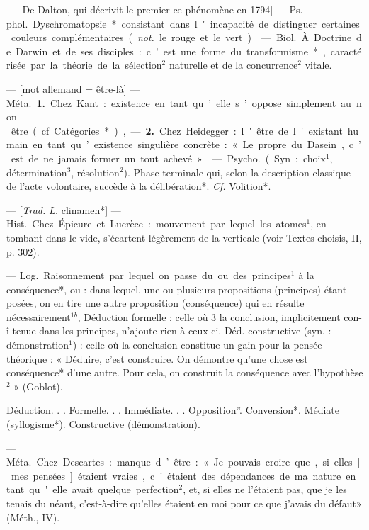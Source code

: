 
	\begin{itemize}[leftmargin=1cm, label=, itemsep=1pt]

 — [De Dalton, qui décrivit
le premier ce phénomène en 1794]
— \si{Ps. phol.} Dyschromatopsie* consistant dans l'incapacité de distinguer certaines couleurs complémentaires ({\it not.} le rouge et le vert).

 — \si{Biol.} À Doctrine de
Darwin et de ses disciples : c'est
une forme du transformisme*, caractérisée par la théorie de la sélection$^2$
naturelle et de la concurrence$^2$
vitale.

 — [mot allemand = être-là] —
\si{Méta.} {\bf 1.} Chez Kant : existence en
tant qu’elle s’oppose simplement au
non-être (cf. Catégories*), — {\bf 2.} Chez
Heidegger : l'être de l'existant
humain en tant qu’existence singulière concrète : « Le propre du Dasein,
c’est de ne jamais former un tout
achevé. »

 — \si{Psycho.} (Syn. : choix$^1$,
détermination$^3$, résolution$^2$). Phase
terminale qui, selon la description
classique de l’acte volontaire, succède à la délibération*. {\it Cf.} Volition*.

 — [{\it Trad.} {\it L.} clinamen*] —
\si{Hist.} Chez Épicure et Lucrèce : mouvement par lequel les atomes$^1$, en
tombant dans le vide, s’écartent
légèrement de la verticale (voir
Textes choisis, II, p. 302).

 — \si{Log.} Raisonnement
par lequel on passe du ou des principes$^1$ à la conséquence*, ou : dans
lequel, une ou plusieurs propositions (principes) étant posées, on en
tire une autre proposition (conséquence) qui en résulte nécessairement$^{1b}$, Déduction formelle : celle où 3
la conclusion, implicitement con- î
tenue dans les principes, n’ajoute
rien à ceux-ci. Déd. constructive
(syn. : démonstration$^1$) : celle où la
conclusion constitue un gain pour la
pensée théorique : « Déduire, c’est
construire. On démontre qu’une
chose est conséquence* d’une autre.
Pour cela, on construit la conséquence avec l'hypothèse$^2$ » (Goblot).

Déduction. . .
 Formelle. . .
  Immédiate. . .
   Opposition”. 
   Conversion*.
  Médiate (syllogisme*).
 Constructive (démonstration).

 — \si{Méta.} Chez Descartes :
manque d’être : « Je pouvais croire
que, si elles [mes pensées] étaient
vraies, c’étaient des dépendances
de ma nature en tant qu'elle avait
quelque perfection$^2$, et, si elles ne
l’étaient pas, que je les tenais du
néant, c'est-à-dire qu’elles étaient
en moi pour ce que j'avais du défaut»
(Méth., IV).


\end{itemize}
